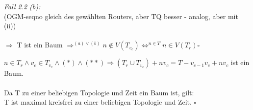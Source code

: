 \documentclass[a4paper,10pt]{scrartcl}[2003/01/01] %
\begin{document}
\emph{Fall 2.2 (b):} \\
(OGM-seqno gleich des gewählten Routers, aber TQ besser - analog, aber mit (ii)) \\\\


$\Rightarrow$ T ist ein Baum $\Rightarrow^{(a) \vee (b)} n \notin V(T_{v_c}) \Leftrightarrow^{n \in T} n \in V(T_r) \square$

$n \in T_r \wedge v_c \in T_{v_c} \wedge (*) \wedge (**) \Rightarrow (T_r \cup T_{v_c}) + nv_c = T - v_{c-1}v_c + nv_c$ ist ein Baum. \\\\



Da T zu einer beliebigen Topologie und Zeit ein Baum ist, gilt: \\
T ist maximal kreisfrei zu einer beliebigen Topologie und Zeit. $\square$
\end{document}
